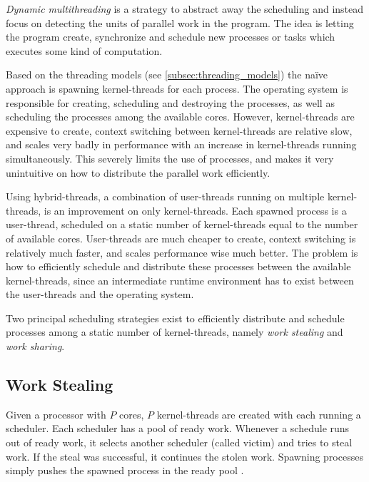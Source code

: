 \textit{Dynamic multithreading} is a strategy to abstract away the scheduling and instead focus on detecting the units of parallel work in the program. The idea is letting the program create, synchronize and schedule new processes or tasks which executes some kind of computation. 

Based on the threading models (see \cref{subsec:threading_models}) the naïve approach is spawning kernel\hyp{}threads for each process. The operating system is responsible for creating, scheduling and destroying the processes, as well as scheduling the processes among the available cores. However, kernel\hyp{}threads are expensive to create, context switching between kernel\hyp{}threads are relative slow, and scales very badly in performance with an increase in kernel\hyp{}threads running simultaneously. This severely limits the use of processes, and makes it very unintuitive on how to distribute the parallel work efficiently.

Using hybrid\hyp{}threads, a combination of user\hyp{}threads running on multiple kernel\hyp{}threads, is an improvement on only kernel\hyp{}threads. Each spawned process is a user\hyp{}thread, scheduled on a static number of kernel\hyp{}threads equal to the number of available cores. User\hyp{}threads are much cheaper to create, context switching is relatively much faster, and scales performance wise much better. The problem is how to efficiently schedule and distribute these processes between the available kernel\hyp{}threads, since an intermediate runtime environment has to exist between the user\hyp{}threads and the operating system.

Two principal scheduling strategies exist to efficiently distribute and schedule processes among a static number of kernel\hyp{}threads, namely \textit{work stealing} and \textit{work sharing}.


\subsection{Work Stealing}
\label{subsec:work_stealing}

Given a processor with $P$ cores, $P$ kernel\hyp{}threads are created with each running a scheduler. Each scheduler has a pool of ready work. Whenever a schedule runs out of ready work, it selects another scheduler (called victim) and tries to steal work. If the steal was successful, it continues the stolen work. Spawning processes simply pushes the spawned process in the ready pool \citep{blumofe1999scheduling}.

